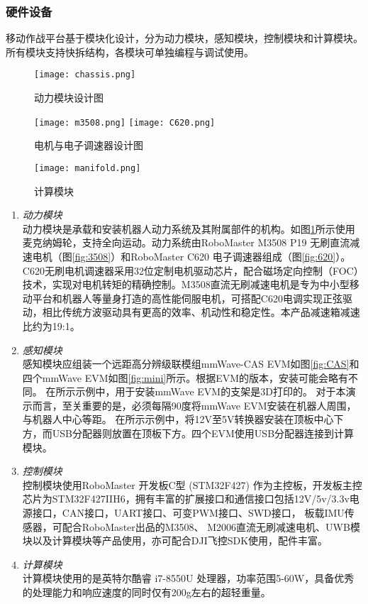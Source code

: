 \documentclass[lang=cn,11pt,a4paper]{elegantpaper}
\begin{document}
\subsubsection{硬件设备}
移动作战平台基于模块化设计，分为动力模块，感知模块，控制模块和计算模块。所有模块支持快拆结构，各模块可单独编程与调试使用。
\begin{figure}[htbp]
  \centering
  \texttt{[image: chassis.png]}
  \caption{动力模块设计图}
  \label{fig:chassis}
\end{figure}

\begin{figure}
  \centering
  {\texttt{[image: m3508.png]}}
  {\texttt{[image: C620.png]}}
  \caption{电机与电子调速器设计图}\label{ele}
\end{figure}

\begin{figure}[htbp]
  \centering
  \texttt{[image: manifold.png]}
  \caption{计算模块}
  \label{fig:manifold}
\end{figure}

\begin{enumerate}[label=\arabic*).]
  \item \textit{动力模块}\\
      动力模块是承载和安装机器人动力系统及其附属部件的机构。如图\ref{fig:chassis}所示使用麦克纳姆轮，支持全向运动。动力系统由RoboMaster M3508 P19 无刷直流减速电机（图\ref{fig:3508}）和RoboMaster C620 电子调速器组成（图\ref{fig:620}）。
      C620无刷电机调速器采用32位定制电机驱动芯片，配合磁场定向控制（FOC）技术，实现对电机转矩的精确控制。M3508直流无刷减速电机是专为中小型移动平台和机器人等量身打造的高性能伺服电机，可搭配C620电调实现正弦驱动，相比传统方波驱动具有更高的效率、机动性和稳定性。本产品减速箱减速比约为19:1。
  \item \textit{感知模块}\\
      感知模块应组装一个远距高分辨级联模组mmWave-CAS EVM如图\ref{fig:CAS}和四个mmWave EVM如图\ref{fig:mini}所示。根据EVM的版本，安装可能会略有不同。
      在所示示例中，用于安装mmWave EVM的支架是3D打印的。
      对于本演示而言，至关重要的是，必须每隔90度将mmWave EVM安装在机器人周围，与机器人中心等距。
      在所示示例中，将12V至5V转换器安装在顶板中心下方，而USB分配器则放置在顶板下方。四个EVM使用USB分配器连接到计算模块。
  \item \textit{控制模块}\\
      控制模块使用RoboMaster 开发板C型 (STM32F427) 作为主控板，开发板主控芯片为STM32F427IIH6，拥有丰富的扩展接口和通信接口包括12V/5v/3.3v电源接口，CAN接口，UART接口、可变PWM接口、SWD接口，
      板载IMU传感器，可配合RoboMaster出品的M3508、 M2006直流无刷减速电机、UWB模块以及计算模块等产品使用，亦可配合DJI飞控SDK使用，配件丰富。
  \item \textit{计算模块}\\
  计算模块使用的是英特尔酷睿 i7-8550U 处理器，功率范围5-60W，具备优秀的处理能力和响应速度的同时仅有200g左右的超轻重量。
\end{enumerate}
\end{document}
